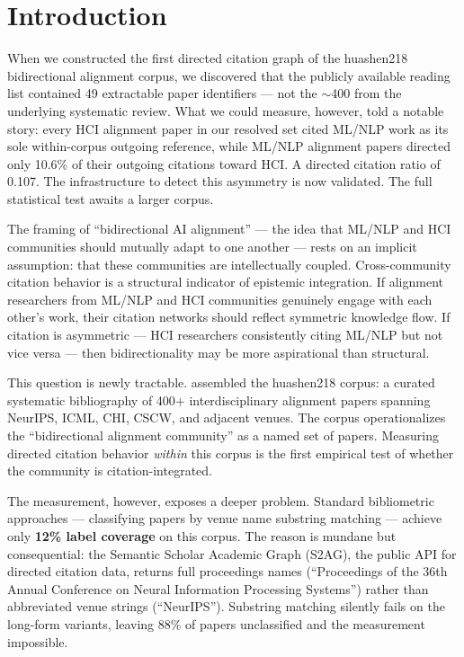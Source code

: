 \section{Introduction}

When we constructed the first directed citation graph of the huashen218 bidirectional alignment corpus, we discovered that the publicly available reading list contained 49 extractable paper identifiers --- not the $\sim$400 from the underlying systematic review.
What we could measure, however, told a notable story: every HCI alignment paper in our resolved set cited ML/NLP work as its sole within-corpus outgoing reference, while ML/NLP alignment papers directed only 10.6\% of their outgoing citations toward HCI.
A directed citation ratio of 0.107.
The infrastructure to detect this asymmetry is now validated. The full statistical test awaits a larger corpus.

The framing of ``bidirectional AI alignment'' --- the idea that ML/NLP and HCI communities should mutually adapt to one another --- rests on an implicit assumption: that these communities are intellectually coupled.
Cross-community citation behavior is a structural indicator of epistemic integration.
If alignment researchers from ML/NLP and HCI communities genuinely engage with each other's work, their citation networks should reflect symmetric knowledge flow.
If citation is asymmetric --- HCI researchers consistently citing ML/NLP but not vice versa --- then bidirectionality may be more aspirational than structural.

This question is newly tractable. \citet{Shen2024Position} assembled the huashen218 corpus: a curated systematic bibliography of 400+ interdisciplinary alignment papers spanning NeurIPS, ICML, CHI, CSCW, and adjacent venues.
The corpus operationalizes the ``bidirectional alignment community'' as a named set of papers.
Measuring directed citation behavior \emph{within} this corpus is the first empirical test of whether the community is citation-integrated.

The measurement, however, exposes a deeper problem.
Standard bibliometric approaches --- classifying papers by venue name substring matching --- achieve only \textbf{12\% label coverage} on this corpus.
The reason is mundane but consequential: the Semantic Scholar Academic Graph (S2AG), the public API for directed citation data, returns full proceedings names (``Proceedings of the 36th Annual Conference on Neural Information Processing Systems'') rather than abbreviated venue strings (``NeurIPS'').
Substring matching silently fails on the long-form variants, leaving 88\% of papers unclassified and the measurement impossible.

